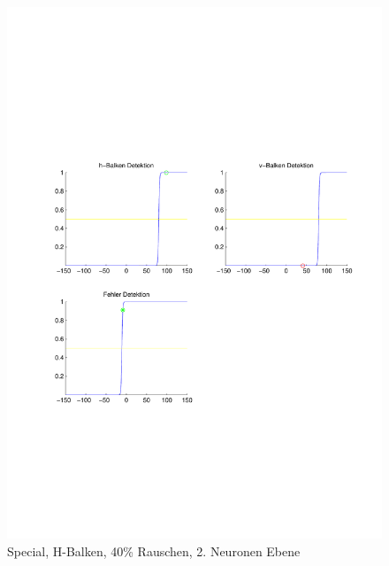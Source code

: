 \begin{figure}[hbt]
\begin{minipage}{0.8 \textwidth}
		\includegraphics[width=\textwidth]{./Bilder/Auswertung/Endergebnis/TypeSpecial_Rauschen40_H_Line_Layer2}
		\caption{Special, H-Balken, 40\% Rauschen, 2. Neuronen Ebene}
		\label{Special_H_40_2}
	\end{minipage}
\end{figure}

